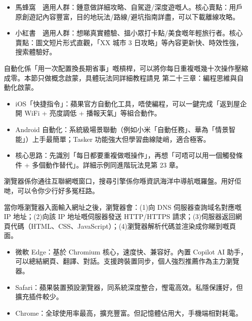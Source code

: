 
\begin{itemize}
  \item 馬蜂窩　適用人群：鍾意做詳細攻略、自駕遊/深度遊嘅人。核心賣點：用戶原創遊記內容豐富，目的地玩法/路線/避坑指南詳盡，可以下載離線攻略。
  \item 小紅書　適用人群：想睇真實體驗、搵小眾打卡點/美食嘅年輕旅行者。核心賣點：圖文短片形式直觀，「XX 城市 3 日攻略」等內容更新快、時效性強，搜索體驗好。
\end{itemize}


自動化係「用一次配置換長期省事」嘅槓桿，可以將你每日重複嘅幾十次操作壓縮成零。本節只做概念啟蒙，具體玩法同詳細教程請見 第二十三章：編程思維與自動化啟蒙。

\begin{itemize}
  \item iOS「快捷指令」：蘋果官方自動化工具，唔使編程，可以一鍵完成「返到屋企開 WiFi + 亮度調低 + 播報天氣」等組合動作。
  \item Android 自動化：系統級場景聯動（例如小米「自動任務」、華為「情景智能」）上手最簡單；Tasker 功能強大但學習曲線陡峭，適合極客。
  \item 核心思路：先識別「每日都要重複做嘅操作」，再想「可唔可以用一個觸發條件 + 多個動作替代」。詳細示例同進階玩法見第 23 章。
\end{itemize}


瀏覽器係你通往互聯網嘅窗口，搜尋引擎係你喺資訊海洋中導航嘅羅盤。用好佢哋，可以令你少行好多冤枉路。


當你喺瀏覽器入面輸入網址之後，瀏覽器會：(1)向 DNS 伺服器查詢域名對應嘅 IP 地址；(2)向該 IP 地址嘅伺服器發送 HTTP/HTTPS 請求；(3)伺服器返回網頁代碼（HTML、CSS、JavaScript）；(4)瀏覽器解析代碼並渲染成你睇到嘅頁面。


\begin{itemize}
  \item 微軟 Edge：基於 Chromium 核心，速度快、兼容好。內置 Copilot AI 助手，可以總結網頁、翻譯、對話。支援跨裝置同步，個人強烈推薦作為主力瀏覽器。
  \item Safari：蘋果裝置預設瀏覽器，同系統深度整合，慳電高效。私隱保護好，但擴充插件較少。
  \item Chrome：全球使用率最高，擴充豐富。但記憶體佔用大，手機端相對耗電。
\end{itemize}

